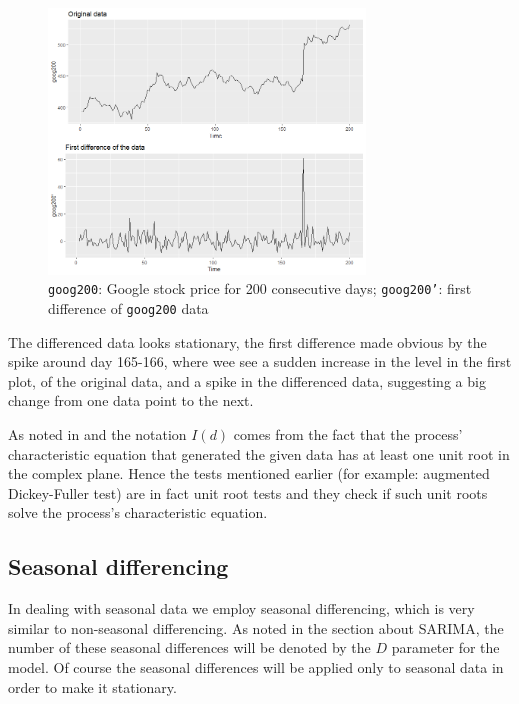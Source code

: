 \documentclass[12pt,a4paper,titlepage]{report}
\begin{document}
\begin{figure}[h]
    \centering
    \includegraphics[width=0.75\textwidth]{ddiffgoog200}
    \caption{\texttt{goog200}: Google stock price for 200 consecutive days; \texttt{goog200'}: first difference of \texttt{goog200} data }
    \label{ddiffgoog200}
\end{figure}

The differenced data looks stationary, the first difference made obvious by the spike around day 165-166, where wee see a sudden increase in the level in the first plot, of the original data, and a spike in the differenced data, suggesting a big change from one data point to the next.

As noted in \cite{churvichunitroot} and \cite{nielsenunitroot} the notation $ I(d) $ comes from the fact that the process' characteristic equation that generated the given data has at least one unit root in the complex plane. Hence the tests mentioned earlier (for example: augmented Dickey-Fuller test) are in fact unit root tests and they check if such unit roots solve the process's characteristic equation.

\subsection{Seasonal differencing}

In dealing with seasonal data we employ seasonal differencing, which is very similar to non-seasonal differencing.
As noted in the section about SARIMA, the number of these seasonal differences will be denoted by the $ D $ parameter for the model.
Of course the seasonal differences will be applied only to seasonal data in order to make it stationary.
\end{document}
